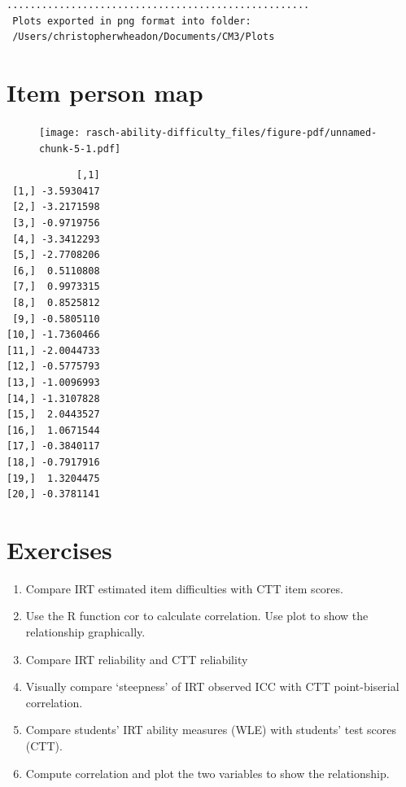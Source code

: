 \documentclass[
  letterpaper,
  DIV=11,
  numbers=noendperiod]{scrreprt}
\newenvironment{Shaded}{\begin{snugshade}}{\end{snugshade}}
\newcommand{\AttributeTok}[1]{\textcolor[rgb]{0.40,0.45,0.13}{#1}}
\newcommand{\FunctionTok}[1]{\textcolor[rgb]{0.28,0.35,0.67}{#1}}
\newcommand{\NormalTok}[1]{\textcolor[rgb]{0.00,0.23,0.31}{#1}}
\newcommand{\SpecialCharTok}[1]{\textcolor[rgb]{0.37,0.37,0.37}{#1}}
\providecommand{\tightlist}{%
  \setlength{\itemsep}{0pt}\setlength{\parskip}{0pt}}\usepackage{longtable,booktabs,array}
\begin{document}
\begin{verbatim}
....................................................
 Plots exported in png format into folder:
 /Users/christopherwheadon/Documents/CM3/Plots
\end{verbatim}

\hypertarget{item-person-map}{%
\section{Item person map}\label{item-person-map}}

\begin{Shaded}
\end{Shaded}

\begin{figure}[H]

{\centering \texttt{[image: rasch-ability-difficulty\_files/figure-pdf/unnamed-chunk-5-1.pdf]}

}

\end{figure}

\begin{verbatim}
            [,1]
 [1,] -3.5930417
 [2,] -3.2171598
 [3,] -0.9719756
 [4,] -3.3412293
 [5,] -2.7708206
 [6,]  0.5110808
 [7,]  0.9973315
 [8,]  0.8525812
 [9,] -0.5805110
[10,] -1.7360466
[11,] -2.0044733
[12,] -0.5775793
[13,] -1.0096993
[14,] -1.3107828
[15,]  2.0443527
[16,]  1.0671544
[17,] -0.3840117
[18,] -0.7917916
[19,]  1.3204475
[20,] -0.3781141
\end{verbatim}

\hypertarget{exercises}{%
\section{Exercises}\label{exercises}}

\begin{enumerate}
\def\labelenumi{\arabic{enumi}.}
\tightlist
\item
  Compare IRT estimated item difficulties with CTT item scores.
\item
  Use the R function cor to calculate correlation. Use plot to show the
  relationship graphically.
\item
  Compare IRT reliability and CTT reliability
\item
  Visually compare `steepness' of IRT observed ICC with CTT
  point-biserial correlation.
\item
  Compare students' IRT ability measures (WLE) with students' test
  scores (CTT).
\item
  Compute correlation and plot the two variables to show the
  relationship.
\end{enumerate}
\end{document}
